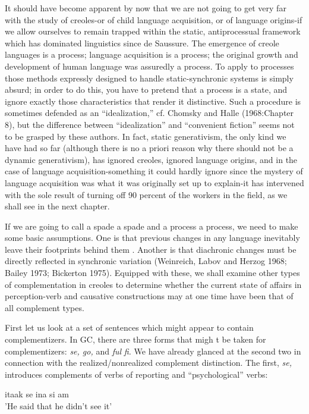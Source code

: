 It should have become apparent by now that we are not going to get very far with the study of creoles-or of child language acquisition, or of language origins-if we allow ourselves to remain trapped within the static, antiprocessual framework which has dominated linguistics since de Saussure. The emergence of creole languages is a process; language acquisition is a process; the original growth and development of human language was assuredly a process. To apply to processes those methods expressly designed to handle static-synchronic systems is simply absurd; in order to do this, you have to pretend that a process
is a state, and ignore exactly those characteristics that render it distinc\-tive. Such a procedure is sometimes defended as an ``idealization,'' cf. Chomsky and Halle (1968:Chapter 8), but the difference between ``idealization'' and ``convenient fiction'' seems not to be grasped by these authors. In fact, static generativism, the only kind we have had so far (although there is no a priori reason why there should not be a dynamic generativism), has ignored creoles, ignored language origins, and in the case of language acquisition-something it could hardly ignore since the mystery of language acquisition was what it was originally set up to explain-it has intervened with the sole result of turning off 90 percent of the workers in the field, as we shall see in the next chapter.

If we are going to call a spade a spade and a process a process, we need to make some basic assumptions. One is that previous changes in any language inevitably leave their footprints behind them \citep{Givan1971}. Another is that diachronic changes must be directly reflected in synchronic variation (Weinreich, Labov and Herzog 1968; Bailey 1973; Bickerton 1975). Equipped with these, we shall examine other types of complementation in creoles to determine whether the current state of affairs in perception-verb and causative constructions may at one time have been that of all complement types.

First let us look at a set of sentences which might appear to contain complementizers. In GC, there are three forms that migh t be taken for complementizers: \textit{se, go,} and \textit{ful} \textit{fi.} We have already glanced at the second two in connection with the realized/nonrealized com\-plement distinction. The first, \textit{se,} introduces complements of verbs of reporting and ``psychological'' verbs:

\ea\label{ex:162}
 itaak se ina si am \\
\glt 'He said that he didn't see it'
\z



